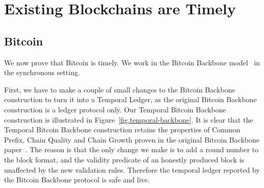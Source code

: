 \section{Existing Blockchains are Timely}


\subsection{Bitcoin}

We now prove that Bitcoin is timely. We work in the Bitcoin Backbone model~\cite{backbone}
in the synchronous setting.

First, we have to make a couple of small changes to the Bitcoin Backbone construction to turn it
into a Temporal Ledger, as the original Bitcoin Backbone construction is a ledger protocol only.
Our Temporal Bitcoin Backbone construction is illustrated in Figure~\ref{fig.temporal-backbone}.
It is clear that the Temporal Bitcoin Backbone construction retains the properties of Common Prefix,
Chain Quality and Chain Growth proven in the original Bitcoin Backbone paper~\cite{backbone}.
The reason is that the only change we make is to add a round number to the block format, and
the validity predicate of an honestly produced block is unaffected by the new validation rules.
Therefore the temporal ledger reported by the Bitcoin Backbone protocol is safe and live.


